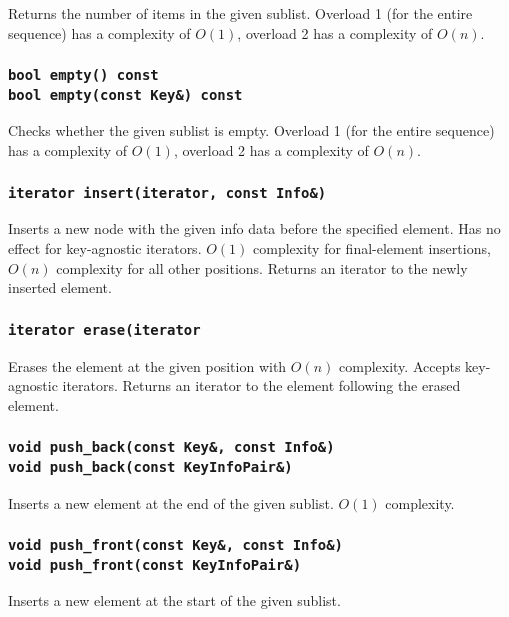 ﻿\documentclass{article}
\begin{document}
Returns the number of items in the given sublist. Overload 1 (for the entire
sequence) has a complexity of $O(1)$, overload 2 has a complexity of $O(n)$.

\subsubsection{{\tt bool empty() const} \\
	{\tt bool empty(const Key\&) const}}
	
Checks whether the given sublist is empty. Overload 1 (for the entire sequence)
has a complexity of $O(1)$, overload 2 has a complexity of $O(n)$.

\subsubsection{{\tt iterator insert(iterator, const Info\&)}}
	
Inserts a new node with the given info data before the specified element. Has
no effect for key-agnostic iterators. $O(1)$ complexity for final-element
insertions, $O(n)$ complexity for all other positions. Returns an iterator to
the newly inserted element.

\subsubsection{{\tt iterator erase(iterator}}
	
Erases the element at the given position with $O(n)$ complexity. Accepts
key-agnostic iterators. Returns an iterator to the element following the erased
element.

\subsubsection{{\tt void push\_back(const Key\&, const Info\&)} \\
	{\tt void push\_back(const KeyInfoPair\&)}}
	
Inserts a new element at the end of the given sublist. $O(1)$ complexity.

\subsubsection{{\tt void push\_front(const Key\&, const Info\&)} \\
	{\tt void push\_front(const KeyInfoPair\&)}}
	
Inserts a new element at the start of the given sublist.
\end{document}

